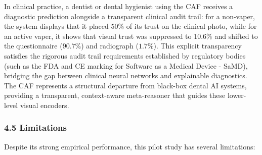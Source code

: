 \documentclass[
]{article}
\begin{document}
In clinical practice, a dentist or dental hygienist using the CAF
receives a diagnostic prediction alongside a transparent clinical audit
trail: for a non-vaper, the system displays that it placed \(50\%\) of
its trust on the clinical photo, while for an active vaper, it shows
that visual trust was suppressed to \(10.6\%\) and shifted to the
questionnaire (\(90.7\%\)) and radiograph (\(1.7\%\)). This explicit
transparency satisfies the rigorous audit trail requirements established
by regulatory bodies (such as the FDA and CE marking for Software as a
Medical Device - SaMD), bridging the gap between clinical neural
networks and explainable diagnostics. The CAF represents a structural
departure from black-box dental AI systems, providing a transparent,
context-aware meta-reasoner that guides these lower-level visual
encoders.

\subsubsection{\texorpdfstring{\textbf{4.5
Limitations}}{4.5 Limitations}}\label{limitations}

Despite its strong empirical performance, this pilot study has several
limitations:
\end{document}
